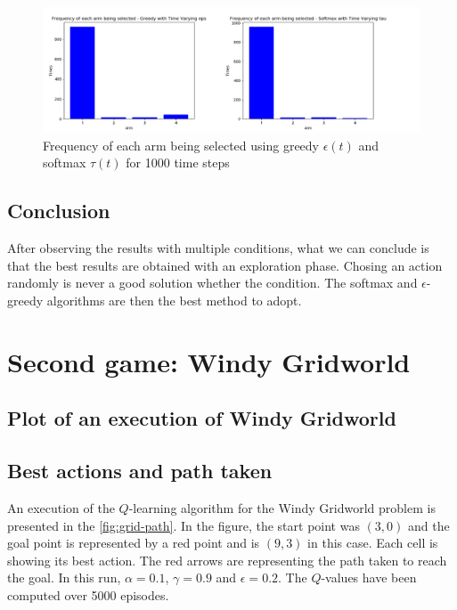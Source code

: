 \documentclass{article}
\begin{document}
\begin{figure}[H]
  \centering
  \includegraphics[scale=1.3]{fig/bandit3-counters.png}
  \caption{Frequency of each arm being selected using greedy $\epsilon (t)$ and softmax $\tau (t)$ for 1000 time steps}
  \label{fig:bandit3-counters}
\end{figure}

\subsection{Conclusion}
After observing the results with multiple conditions, what we can conclude is that the best results are obtained with an exploration phase. Chosing an action randomly is never a good solution whether the condition. The softmax and $\epsilon$-greedy algorithms are then the best method to adopt. 

\newpage

\section{Second game: Windy Gridworld}

\subsection{Plot of an execution of Windy Gridworld}

\subsection{Best actions and path taken}

An execution of the $Q$-learning algorithm for the Windy Gridworld problem is presented in the \autoref{fig:grid-path}. In the figure, the start point was $(3,0)$ and the goal point is represented by a red point and is $(9,3)$ in this case. Each cell is showing its best action. The red arrows are representing the path taken to reach the goal. In this run, $\alpha = 0.1$, $\gamma = 0.9$ and $\epsilon = 0.2$. The $Q$-values have been computed over 5000 episodes.   
\end{document}
